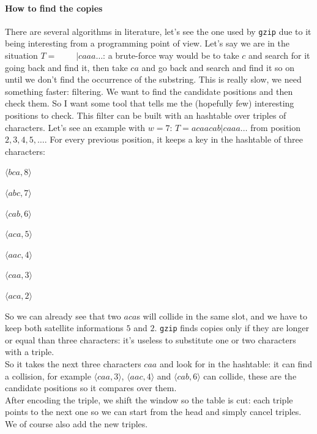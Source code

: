 \documentclass[10pt]{report}
\begin{document}
\paragraph{How to find the copies} There are several algorithms in literature, let's see the one used by \texttt{gzip} due to it being interesting from a programming point of view. Let's say we are in the situation $T = \:\:\:\:\:\:\:\:\:\:|caaa\ldots$: a brute-force way would be to take $c$ and search for it going back and find it, then take $ca$ and go back and search and find it so on until we don't find the occurrence of the substring. This is really slow, we need something faster: filtering. We want to find the candidate positions and then check them. So I want some tool that tells me the (hopefully few) interesting positions to check. This filter can be built with an hashtable over triples of characters. Let's see an example with $w=7$: $T = acaacab|caaa\ldots$ from position $2,3,4,5,\ldots$. For every previous position, it keeps a key in the hashtable of three characters:\begin{list}{}{}
	\item $\langle bca,8\rangle$
	\item $\langle abc,7\rangle$
	\item $\langle cab,6\rangle$
	\item $\langle aca,5\rangle$
	\item $\langle aac,4\rangle$
	\item $\langle caa,3\rangle$
	\item $\langle aca,2\rangle$
\end{list}
So we can already see that two $aca$s will collide in the same slot, and we have to keep both satellite informations $5$ and $2$. \texttt{gzip} finds copies only if they are longer or equal than three characters: it's useless to substitute one or two characters with a triple.\\
So it takes the next three characters $caa$ and look for in the hashtable: it can find a collision, for example $\langle caa,3\rangle$, $\langle aac, 4\rangle$ and $\langle cab,6\rangle$ can collide, these are the candidate positions so it compares over them.\\
After encoding the triple, we shift the window so the table is cut: each triple points to the next one so we can start from the head and simply cancel triples. We of course also add the new triples.
\end{document}
